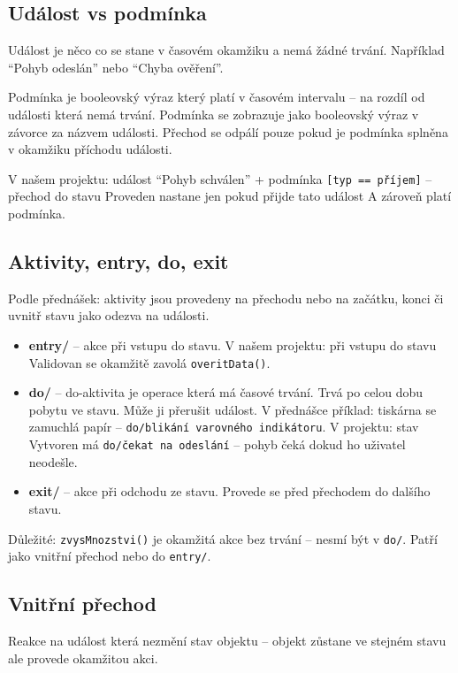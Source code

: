 \documentclass[12pt, a4paper]{article}
\begin{document}
\subsection{Událost vs podmínka}

Událost je něco co se stane v časovém okamžiku a nemá žádné trvání. Například ``Pohyb odeslán'' nebo ``Chyba ověření''.

Podmínka je booleovský výraz který platí v časovém intervalu -- na rozdíl od události která nemá trvání. Podmínka se zobrazuje jako booleovský výraz v závorce za názvem události. Přechod se odpálí pouze pokud je podmínka splněna v okamžiku příchodu události.

V našem projektu: událost ``Pohyb schválen'' + podmínka \texttt{[typ == příjem]} -- přechod do stavu Proveden nastane jen pokud přijde tato událost A zároveň platí podmínka.

\subsection{Aktivity, entry, do, exit}

Podle přednášek: aktivity jsou provedeny na přechodu nebo na začátku, konci či uvnitř stavu jako odezva na události.

\begin{itemize}
  \item \textbf{entry/} -- akce při vstupu do stavu. V našem projektu: při vstupu do stavu Validovan se okamžitě zavolá \texttt{overitData()}.
  \item \textbf{do/} -- do-aktivita je operace která má časové trvání. Trvá po celou dobu pobytu ve stavu. Může ji přerušit událost. V přednášce příklad: tiskárna se zamuchlá papír -- \texttt{do/blikání varovného indikátoru}. V projektu: stav Vytvoren má \texttt{do/čekat na odeslání} -- pohyb čeká dokud ho uživatel neodešle.
  \item \textbf{exit/} -- akce při odchodu ze stavu. Provede se před přechodem do dalšího stavu.
\end{itemize}

Důležité: \texttt{zvysMnozstvi()} je okamžitá akce bez trvání -- nesmí být v \texttt{do/}. Patří jako vnitřní přechod nebo do \texttt{entry/}.

\subsection{Vnitřní přechod}

Reakce na událost která nezmění stav objektu -- objekt zůstane ve stejném stavu ale provede okamžitou akci.
\end{document}
